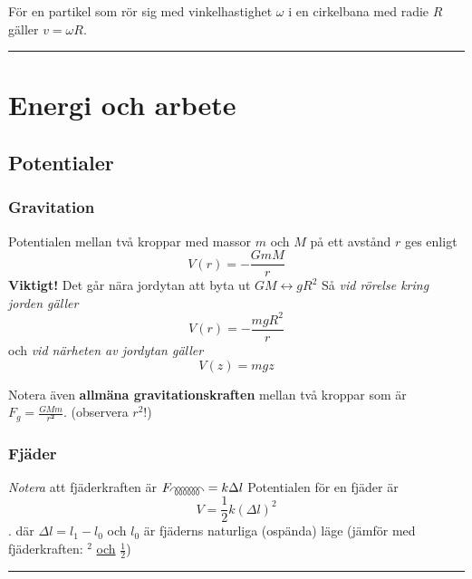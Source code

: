 \documentclass{article}
\newenvironment{ankiflashcard}[1]{}{}
\newcommand{\ruler}{
\rule{0.5\textwidth}{0.5pt}
}
\begin{document}
\begin{paracol}{2}
\begin{ankiflashcard}{Ange sambandet mellan vinkelhastighet och radie vid cirkelrörelse.}
    
För en partikel som rör sig med vinkelhastighet $\omega$ i en cirkelbana med radie $R$ gäller $v=\omega R$.
\end{ankiflashcard}

\ruler
\section{Energi och arbete}
\subsection{Potentialer}

\begin{ankiflashcard}{Definiera gravitationspotentialen, i alla tre fall.}
\subsubsection{Gravitation}
Potentialen mellan två kroppar med massor $m$ och $M$ på ett avstånd $r$ ges enligt
$$
V(r)=-\frac{GmM}{r}
$$
\textbf{Viktigt!} Det går nära jordytan att byta ut $GM\longleftrightarrow gR^2$
Så \textit{vid rörelse kring jorden gäller}
$$
V(r)=-\frac{mgR^2}{r}
$$
och \textit{vid närheten av jordytan gäller}
$$
V(z)=mgz
$$
\end{ankiflashcard}

\begin{ankiflashcard}{Definera allmäna gravitationskraften.}
    Notera även \textbf{allmäna gravitationskraften } mellan två kroppar som är $F_g = \frac{GMm}{r^{\mathbf 2}}$. (observera $r^2$!)
\end{ankiflashcard}
\begin{ankiflashcard}{Definiera potentialenergi och fjäderkraft för en fjäder.}
    \subsubsection{Fjäder}
    \textit{Notera} att fjäderkraften är $F_{\gluon}=k\Delta l$
    Potentialen för en fjäder är
    $$
    V = \frac{1}{2}k(\Delta l)^2
    $$ .
    där $\Delta l=l_1-l_0$ och $l_0$ är fjäderns naturliga (ospända) läge (jämför med fjäderkraften: $^2$ \underline{och} $\frac 1 2$)
\end{ankiflashcard}
\ruler


\end{paracol}
\end{document}
